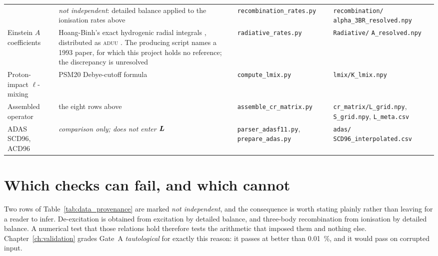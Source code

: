 \begin{table}[htbp]
\begin{tabular}{@{}p{2.6cm}p{3.5cm}p{3.2cm}p{4.3cm}@{}}
      & \emph{not independent}: detailed balance applied to the ionisation
        rates above
      & \texttt{recombination\_rates.py}
      & \texttt{recombination/} \newline \texttt{alpha\_3BR\_resolved.npy} \\
    \addlinespace
    Einstein $A$ \newline coefficients
      & Hoang-Binh's exact hydrogenic radial integrals \cite{HoangBinh1990},
        distributed as \textsc{aduu} \cite{HoangBinh2005}. The producing script
        names a 1993 paper, for which this project holds no reference; the
        discrepancy is unresolved
      & \texttt{radiative\_rates.py}
      & \texttt{Radiative/} \newline \texttt{A\_resolved.npy} \\
    \addlinespace
    Proton-impact \newline $\ell$-mixing
      & PSM20 Debye-cutoff formula \cite{Badnell2021}
      & \texttt{compute\_lmix.py}
      & \texttt{lmix/K\_lmix.npy} \\
    \addlinespace
    Assembled \newline operator
      & the eight rows above
      & \texttt{assemble\_cr\_matrix.py}
      & \texttt{cr\_matrix/L\_grid.npy}, \newline \texttt{S\_grid.npy},
        \texttt{L\_meta.csv} \\
    \addlinespace
    \midrule
    ADAS SCD96, \newline ACD96
      & \emph{comparison only; does not enter $\bm{L}$}
        \cite{Summers2006,ADAS}
      & \texttt{parser\_adasf11.py}, \newline \texttt{prepare\_adas.py}
      & \texttt{adas/} \newline \texttt{SCD96\_interpolated.csv} \\
    \bottomrule
  \end{tabular}
\end{table}

\section{Which checks can fail, and which cannot}

Two rows of Table~\ref{tab:data_provenance} are marked \emph{not independent},
and the consequence is worth stating plainly rather than leaving for a reader to
infer. De-excitation is obtained from excitation by detailed balance, and
three-body recombination from ionisation by detailed balance. A numerical test
that those relations hold therefore tests the arithmetic that imposed them and
nothing else. Chapter~\ref{ch:validation} grades Gate~A \emph{tautological} for
exactly this reason: it passes at better than \SI{0.01}{\percent}, and it would
pass on corrupted input.

